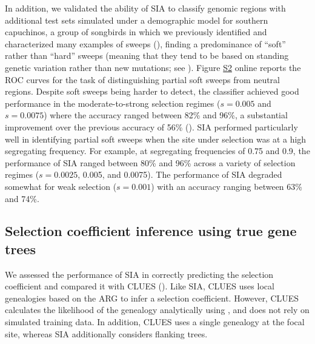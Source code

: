 In addition, we validated the ability of \ac{SIA} to classify genomic regions with additional test sets simulated under a demographic model for southern capuchinos, a group of songbirds in which we previously identified and characterized many examples of sweeps (\cite{hejase_genomic_2020}), finding a predominance of “soft” rather than “hard” sweeps (meaning that they tend to be based on standing genetic variation rather than new mutations; see ). Figure \href{https://academic.oup.com/mbe/article/39/1/msab332/6433161#supplementary-data}{S2} online reports the \ac{ROC} curves for the task of distinguishing partial soft sweeps from neutral regions. Despite soft sweeps being harder to detect, the classifier achieved good performance in the moderate-to-strong selection regimes ($s=0.005$ and $s=0.0075$) where the accuracy ranged between 82\% and 96\%, a substantial improvement over the previous accuracy of 56\% (\cite{hejase_genomic_2020}). \ac{SIA} performed particularly well in identifying partial soft sweeps when the site under selection was at a high segregating frequency. For example, at segregating frequencies of 0.75 and 0.9, the performance of \ac{SIA} ranged between 80\% and 96\% across a variety of selection regimes ($s=0.0025$, 0.005, and 0.0075). The performance of \ac{SIA} degraded somewhat for weak selection ($s=0.001$) with an accuracy ranging between 63\% and 74\%.

\subsection{Selection coefficient inference using true gene trees}
We assessed the performance of \ac{SIA} in correctly predicting the selection coefficient and compared it with CLUES (\cite{stern_approximate_2019}). Like \ac{SIA}, CLUES uses local genealogies based on the \ac{ARG} to infer a selection coefficient. However, CLUES calculates the likelihood of the genealogy analytically using , and does not rely on simulated training data. In addition, CLUES uses a single genealogy at the focal site, whereas \ac{SIA} additionally considers flanking trees.

